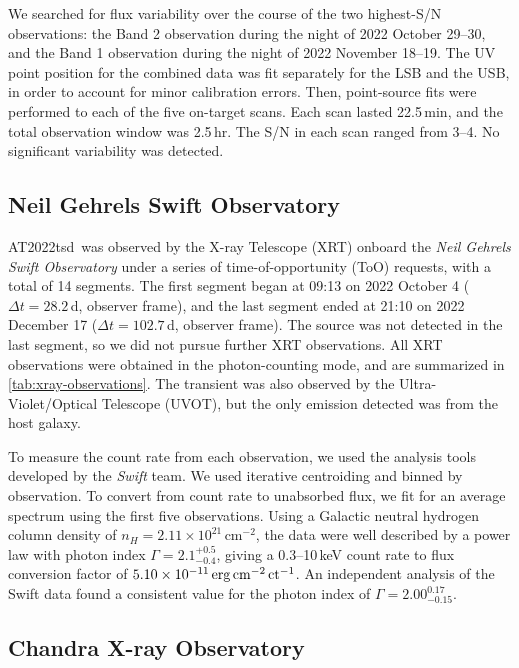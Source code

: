 \documentclass{nature_plusfigure}
\newcommand{\at}{AT2022tsd}
\begin{document}
\begin{methods}
We searched for flux variability over the course of the two highest-S/N observations: the Band 2 observation during the night of 2022 October 29--30, and the Band 1 observation during the night of 2022 November 18--19.
The UV point position for the combined data was fit separately for the LSB and the USB, in
order to account for minor calibration errors.
Then, point-source fits were performed to each of the five on-target scans. Each scan lasted 22.5\,min, and the total observation window was 2.5\,hr. The S/N in each scan ranged from 3--4. No significant variability was detected.

\subsection{Neil Gehrels Swift Observatory}
\label{sec:swift}

\at\ was observed by the X-ray Telescope (XRT\cite{Burrows2005}) onboard the {\it Neil Gehrels Swift Observatory} under a series of time-of-opportunity (ToO) requests, with a total of 14 segments. The first segment began at 09:13 on 2022 October 4 ($\Delta t=28.2\,$d, observer frame), and the last segment ended at 21:10 on 2022 December 17 ($\Delta t=102.7\,$d, observer frame). The source was not detected in the last segment, so we did not pursue further XRT observations.
All XRT observations were obtained in the photon-counting mode, and are summarized in \ref{tab:xray-observations}.
The transient was also observed by the Ultra-Violet/Optical Telescope (UVOT\cite{Roming2005}), but the only emission detected was from the host galaxy. 

To measure the count rate from each observation, we used the analysis tools developed by the {\it Swift} team\cite{Evans2007,Evans2009}.
We used iterative centroiding and binned by observation. 
To convert from count rate to unabsorbed flux, we fit for an average spectrum using the first five observations. Using a Galactic neutral hydrogen column density\cite{Willingale2013} of $n_H=2.11\times10^{21}\,$cm$^{-2}$, the data were well described by a power law with photon index $\Gamma=2.1^{+0.5}_{-0.4}$, 
giving a 0.3--10\,keV count rate to flux conversion factor of $5.10\times 10^{-11}\,\rm erg\,cm^{-2}\,ct^{-1}$.
An independent analysis of the Swift data\cite{Matthews2023} found a consistent value for the photon index of $\Gamma=2.00^{0.17}_{-0.15}$.

\subsection{Chandra X-ray Observatory}
\label{sec:chandra}


\end{methods}
\end{document}
